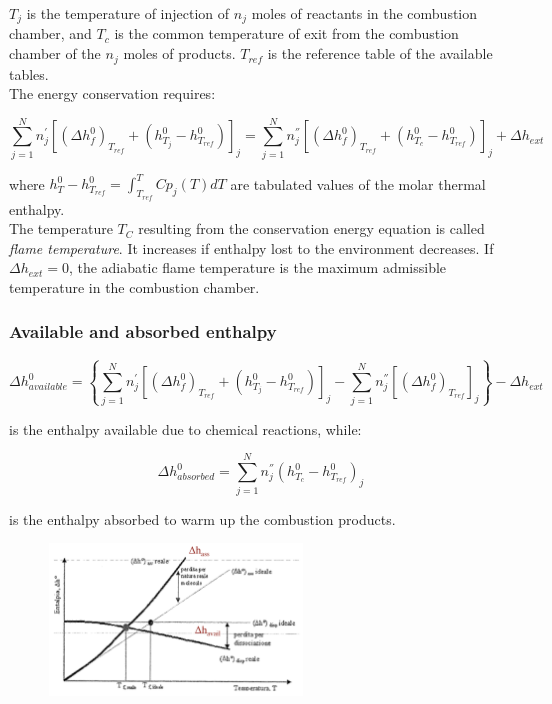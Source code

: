 \documentclass[12pt]{article}
\begin{document}
$T_{j}$ is the temperature of injection of $n_{j}$ moles of reactants in the combustion chamber, and $T_{c}$ is the common temperature of exit from the combustion chamber of the $n_{j}$ moles of products.
$T_{ref}$ is the reference table of the available tables.\\
The energy conservation requires:

\begin{equation}
    \sum_{j=1}^{N}n_{j}^{'}[(\Delta h_{f}^{0})_{T_{ref}}+(h_{T_{j}}^{0}-h_{T_{ref}}^{0})]_{j}
    =
    \sum_{j=1}^{N}n_{j}^{''}[(\Delta h_{f}^{0})_{T_{ref}}+(h_{T_{c}}^{0}-h_{T_{ref}}^{0})]_{j}+\Delta h_{ext}
\end{equation}

where $h_{T}^{0}-h_{T_{ref}}^{0} = \int_{T_{ref}}^{T} Cp_{j}(T)dT$ are tabulated values of the molar thermal enthalpy.\\
The temperature $T_{C}$ resulting from the conservation energy equation is called \textit{flame temperature}. It increases if enthalpy lost to the environment decreases. If $\Delta h_{ext}=0$, the adiabatic flame temperature is the maximum admissible temperature in the combustion chamber.

\subsubsection{Available and absorbed enthalpy}

\begin{equation}
    \Delta h_{available}^{0} = \left\{
    \sum_{j=1}^{N}n_{j}^{'}[(\Delta h_{f}^{0})_{T_{ref}}+(h_{T_{j}}^{0}-h_{T_{ref}}^{0})]_{j}
    -
    \sum_{j=1}^{N}n_{j}^{''}[(\Delta h_{f}^{0})_{T_{ref}}]_{j}\right\} - \Delta h_{ext}
\end{equation}

is the enthalpy available due to chemical reactions, while:

\begin{equation}
    \Delta h_{absorbed}^{0} = \sum_{j=1}^{N}n_{j}^{''}(h_{T_{c}}^{0}-h_{T_{ref}}^{0})_{j}
\end{equation}

is the enthalpy absorbed to warm up the combustion products.

\begin{figure}[!ht]
\centering
\includegraphics[width=0.6\textwidth]{figures/availablevsabsorbed.png}
\end{figure}
\end{document}
